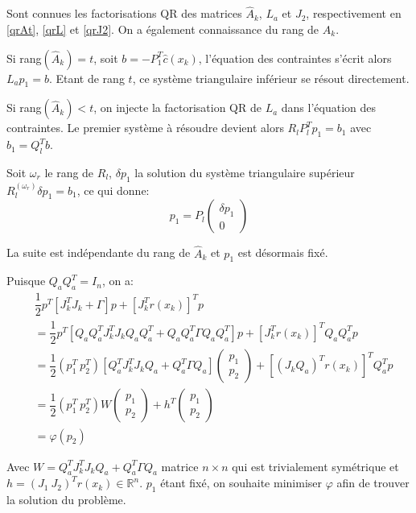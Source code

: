 \documentclass[a4paper,11pt]{article}
\newcommand{\ha}{\hat{A}}
\newcommand{\hc}{\hat{c}}
\numberwithin{equation}{section}
\begin{document}
Sont connues les factorisations QR des matrices $\ha_{k}$, $L_{a}$ et $J_{2}$, respectivement en \ref{qrAt}, \ref{qrL} et \ref{qrJ2}. On a également connaissance du rang de $\ha_{k}$.

Si rang$(\ha_{k})=t$, soit $b = -P_1^T\hc(x_{k})$, l'équation des contraintes s'écrit alors \\ $L_{a}p_1 = b$. Etant de rang $t$, ce système triangulaire inférieur se résout directement.

Si rang$(\ha_{k})<t$, on injecte la factorisation QR de $L_{a}$ dans l'équation des contraintes. Le premier système à résoudre devient alors $R_lP_l^Tp_1 = b_1$ avec $b_{1}=Q_l^{T}b$. 

Soit $\omega_{r}$ le rang de $R_l$, $\delta p_{1}$ la solution du système triangulaire supérieur $R_l^{(\omega_{r})}\delta p_{1} = b_{1}$, ce qui donne:
$$ p_{1} = P_l \begin{pmatrix} \delta p_{1} \\ 0 \end{pmatrix}$$

La suite est indépendante du rang de $\ha_{k}$ et $p_{1}$ est désormais fixé.

Puisque $Q_{a}Q_{a}^T = I_n$, on a:
\begin{align*}
&\dfrac{1}{2}p^T\left[J_{k}^TJ_{k} + \Gamma\right]p + \left[J_{k}^Tr(x_{k})\right]^Tp \\
&= \dfrac{1}{2}p^T\left[Q_{a}Q_{a}^TJ_{k}^TJ_{k}Q_{a}Q_{a}^T + Q_{a}Q_{a}^T\Gamma Q_{a}Q_{a}^T\right]p + \left[J_{k}^Tr(x_{k})\right]^TQ_{a}Q_{a}^Tp \\
&= \dfrac{1}{2}(p_1^T\ p_2^T) \left[Q_{a}^TJ_{k}^TJ_{k}Q_{a} + Q_{a}^T\Gamma Q_{a}\right]\begin{pmatrix} p_1 \\ p_2\end{pmatrix} + \left[(J_{k}Q_{a})^Tr(x_{k})\right]^TQ_{a}^{T}p\\
&= \dfrac{1}{2}(p_1^T\ p_2^T)W\begin{pmatrix}p_1\\p_2\end{pmatrix} + h^T\begin{pmatrix}p_1\\p_2\end{pmatrix} \\
&= \varphi(p_2)
\end{align*}

Avec $W = Q_{a}^TJ_{k}^TJ_{k}Q_{a} + Q_{a}^T\Gamma Q_{a}$ matrice $n\times n$ qui est trivialement symétrique et $h = (J_1\ J_2)^Tr(x_{k}) \in \mathbb{R}^n$. $p_1$ étant fixé, on souhaite minimiser $\varphi$ afin de trouver la solution du problème.
\end{document}
